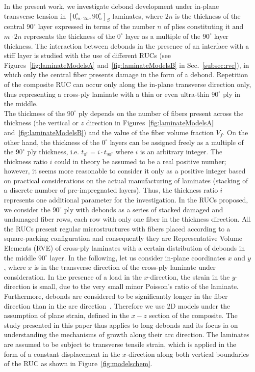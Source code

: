 \documentclass[review]{elsarticle}
\begin{document}
In the present work, we investigate debond development under in-plane transverse tension in $\left[0_{m\cdot2n}^{\circ},90_{n}^{\circ}\right]_{S}$ laminates, where $2n$ is the thickness of the central $90^{\circ}$ layer expressed in terms of the number $n$ of plies constituting it and $m\cdot2n$ represents the thickness of the $0^{\circ}$ layer as a multiple of the $90^{\circ}$ layer thickness. The interaction between debonds in the presence of an interface with a stiff layer is studied with the use of different RUCs (see Figures~\ref{fig:laminateModelsA} and~\ref{fig:laminateModelsB} in Sec.~\ref{subsec:rve}), in which only the central fiber presents damage in the form of a debond. Repetition of the composite RUC can occur only along the in-plane transverse direction only, thus representing a cross-ply laminate with a thin or even ultra-thin $90^{\circ}$ ply in the middle.\\
The thickness of the $90^{\circ}$ ply depends on the number of fibers present across the thickness (the vertical or $z$ direction in Figures~\ref{fig:laminateModelsA} and~\ref{fig:laminateModelsB}) and the value of the fiber volume fraction $V_{f}$. On the other hand, the thickness of the $0^{\circ}$ layers can be assigned freely as a multiple of the $90^{\circ}$ ply thickness, i.e. $t_{0^{\circ}}=i\cdot t_{90^{\circ}}$ where $i$ is an arbitrary integer. The thickness ratio $i$ could in theory be assumed to be a real positive number; however, it seems more reasonable to consider it only as a positive integer based on practical considerations on the actual manufacturing  of laminates (stacking of a discrete number of pre-impregnated layers). Thus, the thickness ratio $i$ represents one additional parameter for the investigation. In the RUCs proposed, we consider the $90^{\circ}$ ply with debonds as a series of stacked damaged and undamaged fiber rows, each row with only one fiber in the thickness direction. All the RUCs present regular microstructures with fibers placed according to a square-packing configuration and consequently they are Representative Volume Elements (RVE) of cross-ply laminates with a certain distribution of debonds in the middle $90^{\circ}$ layer. In the following, let us consider in-plane coordinates $x$ and $y$, where $x$ is in the transverse direction of the cross-ply laminate under consideration. In the presence of a load in the $x$-direction, the strain in the $y$-direction is small, due to the very small minor Poisson's ratio of the laminate. Furthermore, debonds are considered to be significantly longer in the fiber direction than in the arc direction~\cite{Zhang1997}. Therefore we use 2D models under the assumption of plane strain, defined in the $x-z$ section of the composite. The study presented in this paper thus applies to long debonds and its focus ia on understanding the mechanisms of growth along their arc direction. The laminates are assumed to be subject to transverse tensile strain, which is applied in the form of a constant displacement in the $x$-direction along both vertical boundaries of the RUC as shown in  Figure~\ref{fig:modelschem}.\\
\end{document}

